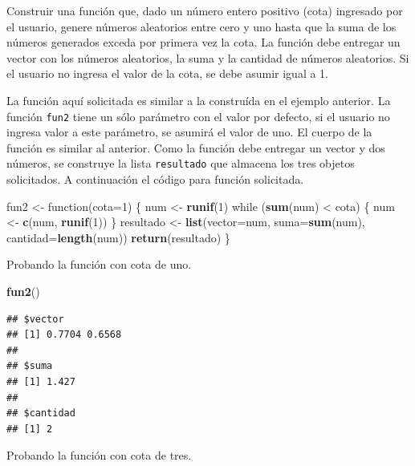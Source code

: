 \documentclass[10pt,]{krantz}
\makeatletter
\newenvironment{Shaded}{\begin{snugshade}}{\end{snugshade}}
\newcommand{\KeywordTok}[1]{\textcolor[rgb]{0.13,0.29,0.53}{\textbf{{#1}}}}
\newcommand{\DataTypeTok}[1]{\textcolor[rgb]{0.13,0.29,0.53}{{#1}}}
\newcommand{\DecValTok}[1]{\textcolor[rgb]{0.00,0.00,0.81}{{#1}}}
\newcommand{\StringTok}[1]{\textcolor[rgb]{0.31,0.60,0.02}{{#1}}}
\newcommand{\NormalTok}[1]{{#1}}
\newenvironment{kframe}{%
\medskip{}
\setlength{\fboxsep}{.8em}
 \def\at@end@of@kframe{}%
 \ifinner\ifhmode%
  \def\at@end@of@kframe{\end{minipage}}%
  \begin{minipage}{\columnwidth}%
 \fi\fi%
 \def\FrameCommand##1{\hskip\@totalleftmargin \hskip-\fboxsep
 \colorbox{shadecolor}{##1}\hskip-\fboxsep
     \hskip-\linewidth \hskip-\@totalleftmargin \hskip\columnwidth}%
 \MakeFramed {\advance\hsize-\width
   \@totalleftmargin\z@ \linewidth\hsize
   \@setminipage}}%
 {\par\unskip\endMakeFramed%
 \at@end@of@kframe}
\renewenvironment{Shaded}{\begin{kframe}}{\end{kframe}}
\makeatother
\begin{document}
Construir una función que, dado un número entero positivo (cota)
ingresado por el usuario, genere números aleatorios entre cero y uno
hasta que la suma de los números generados exceda por primera vez la
cota. La función debe entregar un vector con los números aleatorios, la
suma y la cantidad de números aleatorios. Si el usuario no ingresa el
valor de la cota, se debe asumir igual a 1.

La función aquí solicitada es similar a la construída en el ejemplo
anterior. La función \texttt{fun2} tiene un sólo parámetro con el valor
por defecto, si el usuario no ingresa valor a este parámetro, se asumirá
el valor de uno. El cuerpo de la función es similar al anterior. Como la
función debe entregar un vector y dos números, se construye la lista
\texttt{resultado} que almacena los tres objetos solicitados. A
continuación el código para función solicitada.

\begin{Shaded}
\begin{Highlighting}[]
\NormalTok{fun2 <-}\StringTok{ }\NormalTok{function(}\DataTypeTok{cota=}\DecValTok{1}\NormalTok{) \{}
  \NormalTok{num <-}\StringTok{ }\KeywordTok{runif}\NormalTok{(}\DecValTok{1}\NormalTok{)}
  \NormalTok{while (}\KeywordTok{sum}\NormalTok{(num) <}\StringTok{ }\NormalTok{cota) \{}
    \NormalTok{num <-}\StringTok{ }\KeywordTok{c}\NormalTok{(num, }\KeywordTok{runif}\NormalTok{(}\DecValTok{1}\NormalTok{))}
  \NormalTok{\}}
  \NormalTok{resultado <-}\StringTok{ }\KeywordTok{list}\NormalTok{(}\DataTypeTok{vector=}\NormalTok{num,}
                    \DataTypeTok{suma=}\KeywordTok{sum}\NormalTok{(num),}
                    \DataTypeTok{cantidad=}\KeywordTok{length}\NormalTok{(num))}
  \KeywordTok{return}\NormalTok{(resultado)}
\NormalTok{\}}
\end{Highlighting}
\end{Shaded}

Probando la función con cota de uno.

\begin{Shaded}
\begin{Highlighting}[]
\KeywordTok{fun2}\NormalTok{()}
\end{Highlighting}
\end{Shaded}

\begin{verbatim}
## $vector
## [1] 0.7704 0.6568
## 
## $suma
## [1] 1.427
## 
## $cantidad
## [1] 2
\end{verbatim}

Probando la función con cota de tres.
\end{document}
